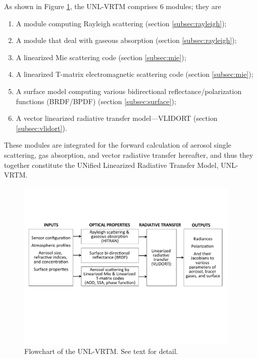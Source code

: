 As shown in Figure \ref{fig:unlvrtm}, the UNL-VRTM comprises 6
modules; they are 
\begin{enumerate}
\item A module computing Rayleigh scattering (section
\ref{subsec:rayleigh});
\item A module that deal with gaseous absorption (section \ref{subsec:rayleigh});
\item A linearized Mie scattering code (section \ref{subsec:mie});
\item A linearized T-matrix electromagnetic scattering code (section
\ref{subsec:mie});
\item A surface model computing various bidirectional
reflectance/polarization functions (BRDF/BPDF) (section
\ref{subsec:surface});
\item A vector linearized radiative transfer model---VLIDORT (section
\ref{subsec:vlidort}). 
\end{enumerate}
These modules are integrated for the forward calculation of
aerosol single scattering, gas absorption, and vector radiative transfer
hereafter, and thus they together constitute the UNified Linearized
Radiative Transfer Model, UNL-VRTM. 

\begin{figure}[t]
  \centering
  \includegraphics[width={0.95\textwidth}]{figures/unlvrtm.pdf}
  \caption{Flowchart of the UNL-VRTM. See text for detail.}
  \label{fig:unlvrtm}
\end{figure}


